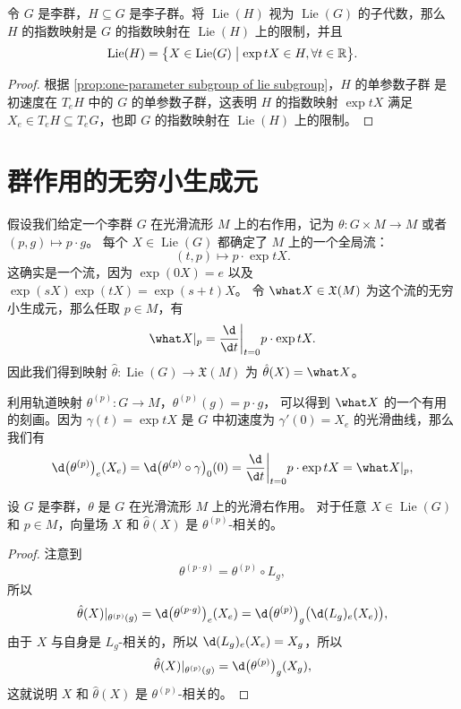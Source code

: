 \documentclass[fontset=none]{Notes}
\DeclareMathOperator\Lie{Lie}
\begin{document}
\begin{proposition}
  令 $G$ 是李群，$H\subseteq G$ 是李子群。将 $\Lie(H)$ 视为 $\Lie(G)$
  的子代数，那么 $H$ 的指数映射是 $G$ 的指数映射在 $\Lie(H)$ 上的限制，并且
  \[
    \Lie(H)=\bigl\{X\in\Lie(G)\bigm| \exp tX\in H,\forall t\in \mathbb{R}\bigr\}  .
  \]
\end{proposition}
\begin{proof}
  根据 \autoref{prop:one-parameter subgroup of lie subgroup}，$H$ 的单参数子群
  是初速度在 $T_eH$ 中的 $G$ 的单参数子群，这表明 $H$ 的指数映射 $\exp tX$ 
  满足 $X_e\in T_eH\subseteq T_eG$，也即 $G$ 的指数映射在 $\Lie(H)$ 上的限制。
\end{proof}

\section{群作用的无穷小生成元}

假设我们给定一个李群 $G$ 在光滑流形 $M$ 上的右作用，记为
$\theta:G\times M\to M$ 或者 $(p,g)\mapsto p\cdot g$。
每个 $X\in\Lie(G)$ 都确定了 $M$ 上的一个全局流：
\[
  (t,p)\mapsto p\cdot \exp tX.  
\]
这确实是一个流，因为 $\exp(0X)=e$ 以及 $\exp(sX)\exp(tX)=\exp(s+t)X$。
令 $\what X\in \mathfrak{X}(M)$ 为这个流的无穷小生成元，那么任取 $p\in M$，有
\[
  \what X|_p=\frac{\d}{\d t}\bigg|_{t=0} p\cdot \exp tX.  
\]
因此我们得到映射 $\hat\theta:\Lie(G)\to \mathfrak{X}(M)$ 为 $\hat\theta (X)=\what X$。

利用轨道映射 $\theta^{(p)}:G\to M$，$\theta^{(p)}(g)=p\cdot g$，
可以得到 $\what X$ 的一个有用的刻画。因为 $\gamma(t)=\exp tX$
是 $G$ 中初速度为 $\gamma'(0)=X_e$ 的光滑曲线，那么我们有
\begin{equation}
  \d\bigl(\theta^{(p)}\bigr)_e(X_e)
  =\d \bigl(\theta^{(p)}\circ\gamma\bigr)_0(0)
  =\frac{\d}{\d t}\bigg|_{t=0}p\cdot \exp tX=\what X|_p,
\end{equation}

\begin{lemma}
  设 $G$ 是李群，$\theta$ 是 $G$ 在光滑流形 $M$ 上的光滑右作用。
  对于任意 $X\in\Lie(G)$ 和 $p\in M$，向量场 $X$ 和 $\hat\theta(X)$
  是 $\theta^{(p)}$-相关的。
\end{lemma}
\begin{proof}
  注意到
  \[
    \theta^{(p\cdot g)}=\theta^{(p)}\circ L_g,  
  \]
  所以
  \[
    \hat\theta(X)|_{\theta^{(p)}(g)}=\d\bigl(\theta^{(p\cdot g)}\bigr)_e
    (X_e)=\d\bigl(\theta^{(p)}\bigr)_g\bigl(\d (L_g)_e(X_e)\bigr),
  \]
  由于 $X$ 与自身是 $L_g$-相关的，所以 $\d(L_g)_e(X_e)=X_g$，所以
  \[
    \hat\theta(X)|_{\theta^{(p)}(g)}=\d\bigl(\theta^{(p)}\bigr)_g(X_g),
  \]
  这就说明 $X$ 和 $\hat\theta(X)$ 是 $\theta^{(p)}$-相关的。
\end{proof}
 
\end{document}
